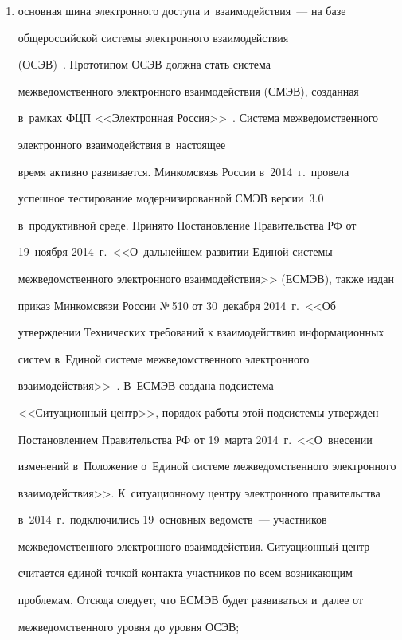      \begin{enumerate}[(1)]

     \item основная шина электронного доступа и~взаимодействия~--- на базе 

общероссийской сис\-те\-мы электронного взаимодействия  

(ОСЭВ)~\cite{2-zat}. Прототипом ОСЭВ должна стать сис\-те\-ма 

межведомственного электронного взаимодействия (СМЭВ), созданная 

в~рамках ФЦП <<Электронная Россия>>~\cite{7-zat}. Сис\-те\-ма межведомственного

электронного взаимодействия в~настоящее 

время активно развивается. Минкомсвязь России в~2014~г.\ провела 

успешное тестирование модернизированной СМЭВ версии~3.0 

в~продуктивной среде. Принято Постановление Правительства РФ от 

19~ноября 2014~г.\ <<О~дальнейшем развитии Единой системы 

межведомственного электронного взаимодействия>> (ЕСМЭВ), также издан 

приказ Минкомсвязи России №\,510 от 30~декабря 2014~г.\ <<Об 

утверждении Технических требований к взаимодействию информационных 

систем в~Единой сис\-те\-ме межведомственного электронного 

взаимодействия>>~\cite{8-zat}. В~ЕСМЭВ создана под\-сис\-те\-ма 

<<Ситуационный центр>>, порядок работы этой под\-сис\-те\-мы утвержден 

Постановлением Правительства РФ от 19~марта 2014~г.\ <<О~внесении 

изменений в~Положение о~Единой сис\-те\-ме межведомственного электронного 

взаимодействия>>. К~ситуационному центру электронного правительства 

в~2014~г.\ подключились 19~основных ведомств~--- участников 

межведомственного электронного взаимодействия. Ситуационный центр 

считается единой точкой контакта участников по всем возникающим 

проблемам. Отсюда следует, что ЕСМЭВ будет развиваться и~далее от 

межведомственного уровня до уровня  ОСЭВ;


\end{enumerate}
